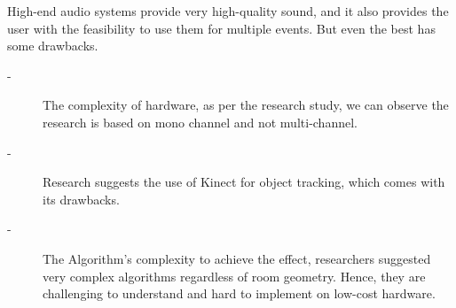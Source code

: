 \documentclass[../../../patent_v1.tex]{subfiles}
\begin{document}
High-end audio systems provide very high-quality sound, and it also provides the 
user with the feasibility to use them for multiple events. But even the best has 
some drawbacks.

\begin{description}
    \item[-]The complexity of hardware, as per the research study, we can observe 
    the research is based on mono channel and not multi-channel. 
    \item[-]Research suggests the use of Kinect for object tracking, which comes 
    with its drawbacks.
    \item[-]The Algorithm's complexity to achieve the effect, researchers suggested 
    very complex algorithms regardless of room geometry. Hence, they are challenging 
    to understand and hard to implement on low-cost hardware.
\end{description}
\end{document}

